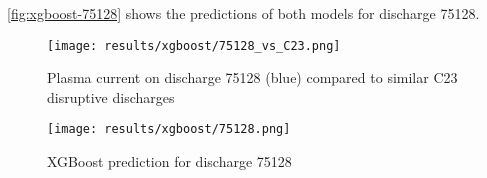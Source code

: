 \autoref{fig:xgboost-75128} shows the predictions of both models for discharge 75128.

\begin{figure}[H]
    \centering
    \texttt{[image: results/xgboost/75128\_vs\_C23.png]}
    \caption{Plasma current on discharge 75128 (blue) compared to similar C23 disruptive discharges}
    \label{fig:ip_75128}
\end{figure}

\begin{figure}[H]
    \centering
    \texttt{[image: results/xgboost/75128.png]}
    \caption{XGBoost prediction for discharge 75128}
    \label{fig:xgboost-75128}
\end{figure}



